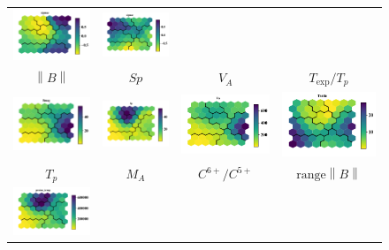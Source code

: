 \documentclass[border=0pt,varwidth=18cm,convert={outext=.jpg,density=300}]{standalone}%
\begin{document}
\begin{figure}[h!]
\begin{tabular}{CCCC}
		\includegraphics[width=4cm]{Amaya/comp-map-sigmac} &
		\includegraphics[width=4cm]{Amaya/comp-map-sigmar}\hfill
		\\
		$\left\lVert B \right\rVert $ & $Sp$ & $V_{A}$ & $T_{\text{exp}}/T_p$ \\
		\includegraphics[width=4cm]{Amaya/comp-map-log_Bmag} &
		\includegraphics[width=4cm]{Amaya/comp-map-log_Sp} &
		\includegraphics[width=4cm]{Amaya/comp-map-log_Va} &
		\includegraphics[width=4cm]{Amaya/comp-map-log_Tratio}\hfill
		\\
		$T_p$ & $M_A$ & $C^{6+}/C^{5+}$ & $\text{range} \left\lVert B \right\rVert $ \\
		\includegraphics[width=4cm]{Amaya/comp-map-log_proton_temp} &

\end{tabular}
\end{figure}
\end{document}
